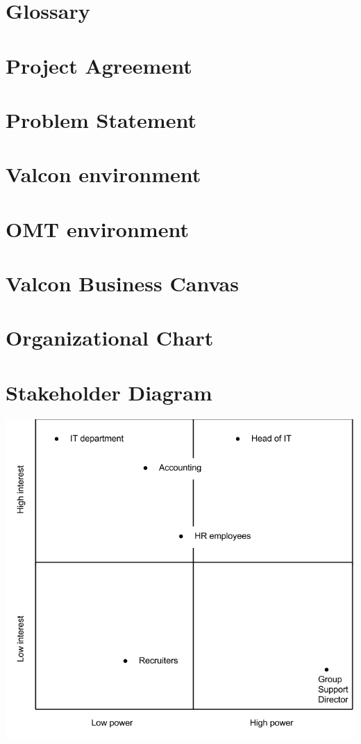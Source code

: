 \chapter{Glossary}

\chapter{Project Agreement}

\chapter{Problem Statement}

\chapter{Valcon environment}

\chapter{OMT environment}

\chapter{Valcon Business Canvas}


\label{app:it_strategy}

\chapter{Organizational Chart}

\chapter{Stakeholder Diagram}
\label{app:stakeholder_diagram}
\includegraphics[width=\textwidth]{appendix/stakeholder_diagram.png}
